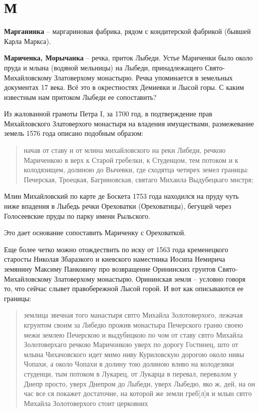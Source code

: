 \chapter*{М}

\textbf{Марганинка} – маргариновая фабрика, рядом с кондитерской фабрикой (бывшей Карла Маркса).\\

\medskip

\textbf{Мариченка, Морычанка} – речка, приток Лыбеди. Устье Мариченки было около пруда и млына (водяной мельницы) на Лыбеди, принадлежащего Свято-Михайловскому Златоверхому монастырю. Речка упоминается в земельных документах 17 века. Всё это в окрестностях Демиевки и Лысой горы. С каким известным нам притоком Лыбеди ее сопоставить?

Из жалованной грамоты Петра I, за 1700 год, в подтверждение прав Михайловского Златоверхого монастыря на владения имуществами, размежевание земель 1576 года описано подобным образом:

\begin{quotation}
начав от ставу и от млина михайловского на реки Либеди, речкою Мариченкою в верх к Старой гребелки, к Студенцом, тем потоком и к колодязищем, долиною до Вычевки, где сходятца четирех земел границы: Печерская, Троецкая, Багриновская, святаго Михаила Выдубецкаго мнстря;
\end{quotation}

Млин Михайловский по карте де Боскета 1753 года находился на пруду чуть ниже впадения в Лыбедь речки Ореховатки (Ореховатицы), бегущей через Голосеевские пруды по парку имени Рыльского.

Это дает основание сопоставить Мариченку с Ореховаткой.

Еще более четко можно отождествить по иску от 1563 года кременецкого старосты Николая Збаразкого и киевского наместника 
Иосипа Немирича земянину Максиму Панковичу про возвращение Орининских грунтов Свято-Михайловскому Златоверхому монастырю. Орининская земля – условно говоря то, что сейчас слывет правобережной Лысой горой. И вот как описываются ее границы:

\begin{quotation}
землица звечная того манастыря свтго Михайла Золотоверхого, лежачая кгрунтом своим за Либедю прожив монастыра Печерского граню своею межи землею Печерскою и выдубицкою по чом от ставу свтго Михайла Золотоверхаго речкою Маричонкою уверх по дорогу Гостинец, што от млына Чихачовского идет мимо ниву Куриловскую дорогою около нивы Чопахи, а около Чопахи в долину тою долиною вливо на
колодезики студенци, тым потоком в Лукарец, от Лукарца в перевал, перевалом у Днепр просто, уверх Днепром до Лыбеди, уверх Лыбедю, яко ж, дей, на он час все ся покажет достаточне, на которой же земли греб[л]я и млын свтго Михайла Золотоверхого стоит церковних
\end{quotation}

